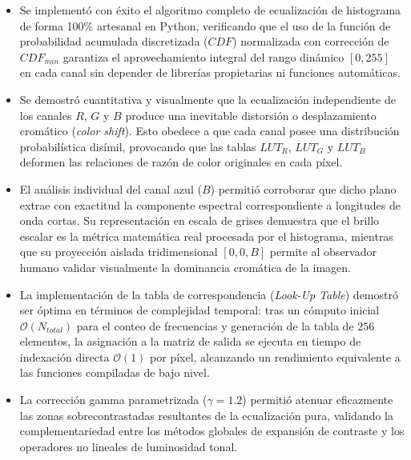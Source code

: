 \documentclass[12pt,a4paper]{article}
\begin{document}
\begin{itemize}[leftmargin=1.2cm]
    \item Se implementó con éxito el algoritmo completo de ecualización de histograma de forma 100\% artesanal en Python, verificando que el uso de la función de probabilidad acumulada discretizada ($CDF$) normalizada con corrección de $CDF_{min}$ garantiza el aprovechamiento integral del rango dinámico $[0, 255]$ en cada canal sin depender de librerías propietarias ni funciones automáticas.
    
    \item Se demostró cuantitativa y visualmente que la ecualización independiente de los canales $R$, $G$ y $B$ produce una inevitable distorsión o desplazamiento cromático (\textit{color shift}). Esto obedece a que cada canal posee una distribución probabilística disímil, provocando que las tablas $LUT_R$, $LUT_G$ y $LUT_B$ deformen las relaciones de razón de color originales en cada píxel.
    
    \item El análisis individual del canal azul ($B$) permitió corroborar que dicho plano extrae con exactitud la componente espectral correspondiente a longitudes de onda cortas. Su representación en escala de grises demuestra que el brillo escalar es la métrica matemática real procesada por el histograma, mientras que su proyección aislada tridimensional $[0, 0, B]$ permite al observador humano validar visualmente la dominancia cromática de la imagen.
    
    \item La implementación de la tabla de correspondencia (\textit{Look-Up Table}) demostró ser óptima en términos de complejidad temporal: tras un cómputo inicial $\mathcal{O}(N_{total})$ para el conteo de frecuencias y generación de la tabla de $256$ elementos, la asignación a la matriz de salida se ejecuta en tiempo de indexación directa $\mathcal{O}(1)$ por píxel, alcanzando un rendimiento equivalente a las funciones compiladas de bajo nivel.
    
    \item La corrección gamma parametrizada ($\gamma = 1.2$) permitió atenuar eficazmente las zonas sobrecontrastadas resultantes de la ecualización pura, validando la complementariedad entre los métodos globales de expansión de contraste y los operadores no lineales de luminosidad tonal.
\end{itemize}

\end{document}
